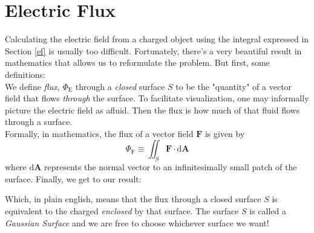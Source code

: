 \section{Electric Flux}
Calculating the electric field from a charged object using the integral expressed in Section \ref{ef} is usually too difficult. 
Fortunately, there's a very beautiful result in mathematics that allows us to reformulate the problem. But first, some definitions:\\

We define \textit{flux}, $\Phi_{\mathrm{E} }$ through a \textit{closed} surface $S$ to be the "quantity" of a vector field that flows \textit{through} the surface.
To facilitate visualization, one may informally picture the electric field as afluid. Then the flux is how much of that fluid flows through a surface.\\
Formally, in mathematics, the flux of a vector field $\mathbf{F} $ is given by
\[
	\Phi_{\mathrm{F} }\equiv \iint_S \mathbf{F} \cdot \mathrm{d} \mathbf{A} 
\] 
where $\mathrm{d} \mathbf{A}$ represents the normal vector to an infinitesimally small patch of the surface. Finally, we get to our result:
Which, in plain english, means that the flux through a closed surface $S$ is equivalent to the charged \textit{enclosed} by that surface. The surface $S$ is called a \textit{Gaussian Surface} and we are free to choose whichever surface we want!\\

